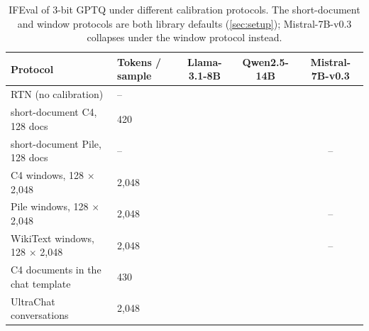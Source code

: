\begin{table}[t]
\caption{IFEval of 3-bit GPTQ under different calibration protocols. The short-document and window protocols are both library defaults (\cref{sec:setup}); Mistral-7B-v0.3 collapses under the window protocol instead.}
\label{tab:protocols_result}
\begin{center}
\small
\begin{tabular}{llccc}
\toprule
Protocol & Tokens / sample & Llama-3.1-8B & Qwen2.5-14B & Mistral-7B-v0.3 \\
\midrule
RTN (no calibration)              & --    & \LrtnIF{}   & \QrtnIF{}   & \MrtnIF{} \\
short-document C4, 128 docs       & 420   & \LgptqIF{}  & \QgptqIF{}  & \MshortIF{} \\
short-document Pile, 128 docs     & --    & \LpileShortIF{} & \QpileShortIF{} & -- \\
C4 windows, 128 $\times$ 2,048    & 2,048 & \LcwinIF{}  & \QcwinIF{}  & \MgptqIF{} \\
Pile windows, 128 $\times$ 2,048  & 2,048 & \LpileIF{}  & \QpileIF{}  & -- \\
WikiText windows, 128 $\times$ 2,048 & 2,048 & \LwikiIF{} & \QwikiIF{} & -- \\
C4 documents in the chat template & 430   & \LcchatIF{} & \QcchatIF{} & \McchatIF{} \\
UltraChat conversations           & 2,048 & \LuchatIF{} & \QuchatIF{} & \MuchatIF{} \\
\bottomrule
\end{tabular}
\end{center}
\end{table}
